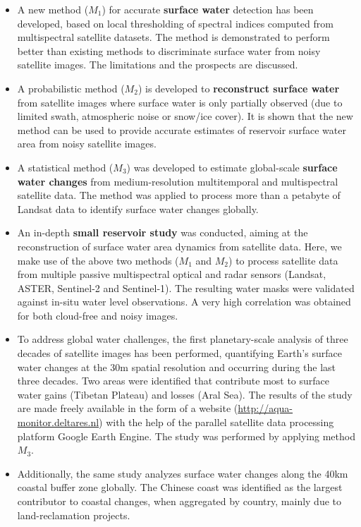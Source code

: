 \begin{itemize}
	\item A new method ($M_1$) for accurate \textbf{surface water} detection has been developed, based on local thresholding of spectral indices computed from multispectral satellite datasets. The method is demonstrated to perform better than existing methods to discriminate surface water from noisy satellite images. The limitations and the prospects are discussed.
	
	\item A probabilistic method ($M_2$) is developed to \textbf{reconstruct surface water} from satellite images where surface water is only partially observed (due to limited swath, atmospheric noise or snow/ice cover). It is shown that the new method can be used to provide accurate estimates of reservoir surface water area from noisy satellite images.
	
	\item A statistical method ($M_3$) was developed to estimate global-scale \textbf{surface water changes} from medium-resolution multitemporal and multispectral satellite data. The method was applied to process more than a petabyte of Landsat data to identify surface water changes globally.
	
	\item An in-depth \textbf{small reservoir study} was conducted, aiming at the reconstruction of surface water area dynamics from satellite data. Here, we make use of the above two methods ($M_1$ and $M_2$)  to process satellite data from multiple passive multispectral optical and radar sensors (Landsat, ASTER, Sentinel-2 and Sentinel-1). The resulting water masks were validated against in-situ water level observations. A very high correlation was obtained for both cloud-free and noisy images. 
	
	\item To address global water challenges, the first planetary-scale analysis of three decades of satellite images has been performed, quantifying Earth's surface water changes at the 30m spatial resolution and occurring during the last three decades. Two areas were identified that contribute most to surface water gains (Tibetan Plateau) and losses (Aral Sea). The results of the study are made freely available in the form of a website (\url{http://aqua-monitor.deltares.nl}) with the help of the parallel satellite data processing platform Google Earth Engine. The study was performed by applying method $M_3$.
	
	\item Additionally, the same study analyzes surface water changes along the 40km coastal buffer zone globally. The Chinese coast was identified as the largest contributor to coastal changes, when aggregated by country, mainly due to land-reclamation projects.
	

\end{itemize}
